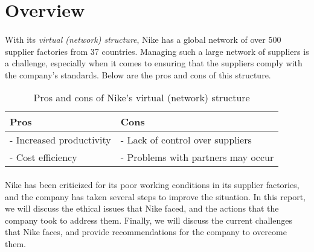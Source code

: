 \section{Overview}

\paragraph{} With its \textit{virtual (network) structure}, Nike has a global network of over 500 supplier factories from 37 countries. Managing such a large network of suppliers is a challenge, especially when it comes to ensuring that the suppliers comply with the company's standards. Below are the pros and cons of this structure.

\begin{table}[H]
    \centering
    \begin{tabular}{|l|l|}
        \hline
        Pros & Cons \\
        \hline
        - Increased productivity & - Lack of control over suppliers \\
        - Cost efficiency & - Problems with partners may occur \\
        \hline
    \end{tabular}
    \caption{Pros and cons of Nike's virtual (network) structure}
    \label{tab:virtual-structure}
\end{table}

\paragraph{} Nike has been criticized for its poor working conditions in its supplier factories, and the company has taken several steps to improve the situation. In this report, we will discuss the ethical issues that Nike faced, and the actions that the company took to address them. Finally, we will discuss the current challenges that Nike faces, and provide recommendations for the company to overcome them.